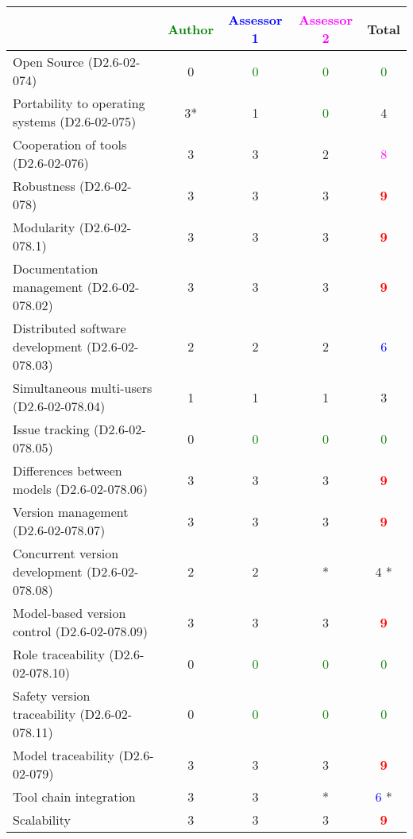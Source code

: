 \begin{tabular}{|l | c | c | c | c|}
\hline
& \textcolor{green}{Author} & \textcolor{blue}{Assessor 1} & \textcolor{magenta}{Assessor 2} & Total \\
\hline 
Open Source (D2.6-02-074) &  0& \textcolor{green}{0} & \textcolor{green}{0}   & \textcolor{green}{0} \\
\hline 
Portability to operating systems (D2.6-02-075) &  3*&
1 & \textcolor{green}{0}   & 4     \\
\hline
Cooperation of tools (D2.6-02-076) &  3& 3     &2 & \textcolor{magenta}{8} \\
\hline
Robustness (D2.6-02-078) &  3& 3     &3 & \textcolor{red}{\textbf{9}} \\
\hline
Modularity (D2.6-02-078.1) &  3& 3     &3 & \textcolor{red}{\textbf{9}} \\
\hline
Documentation management (D2.6-02-078.02) &  3& 3     &3 & \textcolor{red}{\textbf{9}} \\
\hline
Distributed software development (D2.6-02-078.03)  &
2& 2     &2 & \textcolor{blue}{6} \\
\hline
Simultaneous multi-users (D2.6-02-078.04)   &  1& 1     &1 & 3     \\
\hline
Issue tracking (D2.6-02-078.05) &  0& \textcolor{green}{0}   & \textcolor{green}{0}   & \textcolor{green}{0} \\
\hline
Differences between models (D2.6-02-078.06) &  3& 3     &3 & \textcolor{red}{\textbf{9}} \\
\hline
Version management (D2.6-02-078.07) &  3& 3     &3 & \textcolor{red}{\textbf{9}} \\
\hline
Concurrent version development (D2.6-02-078.08) &  2&
2& * & 4    * \\
\hline
Model-based version control (D2.6-02-078.09) &  3& 3     &3 & \textcolor{red}{\textbf{9}} \\
\hline
Role traceability (D2.6-02-078.10) &  0& \textcolor{green}{0} & \textcolor{green}{0}   & \textcolor{green}{0} \\
\hline
Safety version traceability (D2.6-02-078.11) &  0& \textcolor{green}{0} & \textcolor{green}{0}   & \textcolor{green}{0} \\
\hline
Model traceability (D2.6-02-079) & 3     & 3     &3 & \textcolor{red}{\textbf{9}} \\
\hline
Tool chain integration & 3     & 3     &* & \textcolor{blue}{6} * \\
\hline
Scalability & 3     & 3     &3 & \textcolor{red}{\textbf{9}} \\
\hline
\end{tabular}

